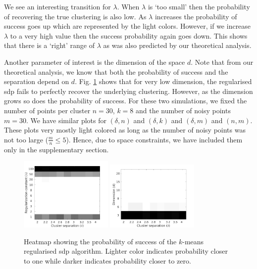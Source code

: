 \documentclass[12pt]{article}
\begin{document}
We see an interesting transition for $\lambda$. When $\lambda$ is `too small' then the probability of recovering the true clustering is also low. As $\lambda$ increases the probability of success goes up which are represented by the light colors. However, if we increase $\lambda$ to a very high value then the success probability again goes down. This shows that there is a `right' range of $\lambda$ as was also predicted by our theoretical analysis. 

Another parameter of interest is the dimension of the space $d$. Note that from our theoretical analysis, we know that both the probability of success and the separation depend on $d$. Fig. \ref{figure:simulation} shows that for very low dimension, the regularised sdp fails to perfectly recover the underlying clustering. However, as the dimension grows so does the probability of success. For these two simulations, we fixed the number of points per cluster $n = 30$, $k = 8$ and the number of noisy points $m = 30$. We have similar plots for $(\delta, n)$ and $(\delta, k)$ and $(\delta, m)$ and $(n, m)$. These plots very mostly light colored as long as the number of noisy points was not too large ($\frac{m}{n} \le 5$). Hence, due to space constraints, we have included them only in the supplementary section.
   
\begin{figure}[t]
  \label{figure:simulation}
  \centering
  \includegraphics[width=0.4\textwidth]{figures/optimizationClustering/deltaLambda.png}
  \includegraphics[width=0.4\textwidth]{figures/optimizationClustering/deltaD.png}
  \caption{Heatmap showing the probability of success of the $k$-means regularised sdp algorithm. Lighter color indicates probability closer to one while darker indicates probability closer to zero.}  
\end{figure}
\end{document}
